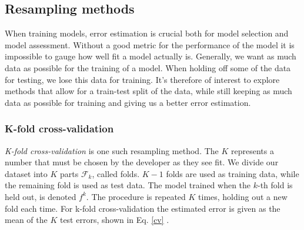 




\subsection{Resampling methods}

When training models, error estimation is crucial both for model selection and model assessment. Without a good metric for the performance of the model it is impossible to gauge how well fit a model actually is.
Generally, we want as much data as possible for the training of a model. When holding off some of the data for testing, we lose this data for training. It's therefore of interest to explore methods that allow for a train-test split of the data, while still keeping as much data as possible for training and giving us a better error estimation.

\subsubsection{K-fold cross-validation}
\textit{K-fold cross-validation} is one such resampling method. The $K$ represents a number that must be chosen by the developer as they see fit. We divide our dataset into $K$ parts $\mathcal{F}_k$, called folds. $K-1$ folds are used as training data, while the remaining fold is used as test data. The model trained when the $k$-th fold is held out, is denoted $f^{k}$. 
The procedure is repeated $K$ times, holding out a new fold each time. For k-fold cross-validation the estimated error is given as the mean of the $K$ test errors, shown in Eq. \ref{cv} \citep[p. 241]{hastie}.


